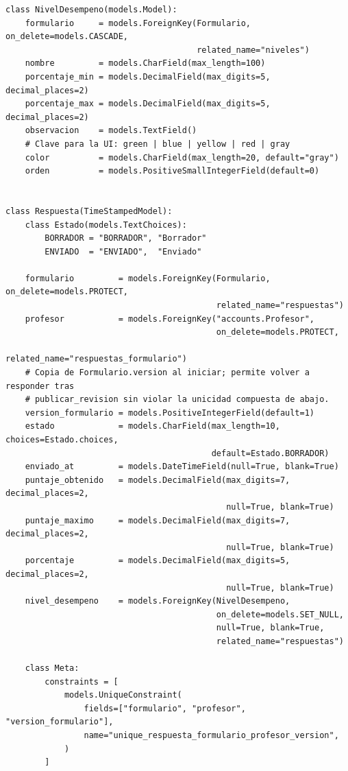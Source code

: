 \begin{Verbatim}[fontsize=\small, frame=single]
class NivelDesempeno(models.Model):
    formulario     = models.ForeignKey(Formulario, on_delete=models.CASCADE,
                                       related_name="niveles")
    nombre         = models.CharField(max_length=100)
    porcentaje_min = models.DecimalField(max_digits=5, decimal_places=2)
    porcentaje_max = models.DecimalField(max_digits=5, decimal_places=2)
    observacion    = models.TextField()
    # Clave para la UI: green | blue | yellow | red | gray
    color          = models.CharField(max_length=20, default="gray")
    orden          = models.PositiveSmallIntegerField(default=0)


class Respuesta(TimeStampedModel):
    class Estado(models.TextChoices):
        BORRADOR = "BORRADOR", "Borrador"
        ENVIADO  = "ENVIADO",  "Enviado"

    formulario         = models.ForeignKey(Formulario, on_delete=models.PROTECT,
                                           related_name="respuestas")
    profesor           = models.ForeignKey("accounts.Profesor",
                                           on_delete=models.PROTECT,
                                           related_name="respuestas_formulario")
    # Copia de Formulario.version al iniciar; permite volver a responder tras
    # publicar_revision sin violar la unicidad compuesta de abajo.
    version_formulario = models.PositiveIntegerField(default=1)
    estado             = models.CharField(max_length=10, choices=Estado.choices,
                                          default=Estado.BORRADOR)
    enviado_at         = models.DateTimeField(null=True, blank=True)
    puntaje_obtenido   = models.DecimalField(max_digits=7, decimal_places=2,
                                             null=True, blank=True)
    puntaje_maximo     = models.DecimalField(max_digits=7, decimal_places=2,
                                             null=True, blank=True)
    porcentaje         = models.DecimalField(max_digits=5, decimal_places=2,
                                             null=True, blank=True)
    nivel_desempeno    = models.ForeignKey(NivelDesempeno,
                                           on_delete=models.SET_NULL,
                                           null=True, blank=True,
                                           related_name="respuestas")

    class Meta:
        constraints = [
            models.UniqueConstraint(
                fields=["formulario", "profesor", "version_formulario"],
                name="unique_respuesta_formulario_profesor_version",
            )
        ]



\end{Verbatim}
